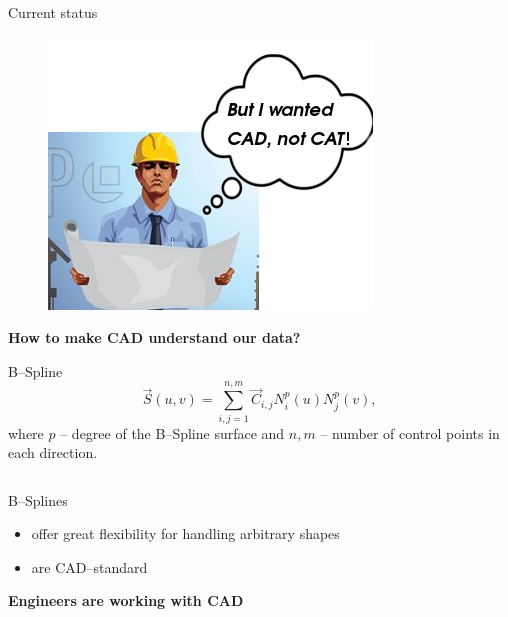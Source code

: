 \begin{frame}{Current status}
\begin{minipage}[t]{0.6\linewidth}
\begin{figure}
\includegraphics[width=0.9\linewidth]{Pictures/engineerThoughts2.png}
\end{figure}
\vspace{5mm}
\end{minipage}

\textbf{How to make CAD understand our data?}
\end{frame}

\begin{frame}{B--Spline}
\begin{equation*}
\vec{S}\left(u,v\right)=\sum\limits_{i,j=1}^{n,m} \vec{C}_{i,j} N_i^p\left(u\right) N_j^p\left(v\right),
\end{equation*}
where $p$ -- degree of the B--Spline surface and $n,m$ -- number of control points in each direction.
\begin{columns}
\begin{column}{.45\textwidth}
B--Splines
\begin{itemize}
\item offer great flexibility for handling arbitrary shapes
\item are CAD--standard
\end{itemize}
\textbf{Engineers are working with CAD}
\end{column}
\begin{column}{.45\textwidth}

\end{column}
\end{columns}
\end{frame}

